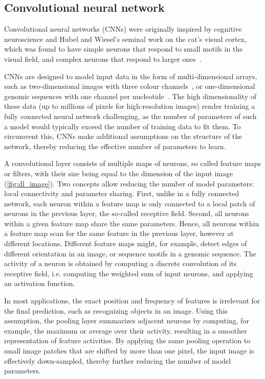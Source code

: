 \subsection{Convolutional neural network}
Convolutional neural networks (CNNs) were originally inspired by cognitive neuroscience and Hubel and Wiesel's seminal work on the cat's visual cortex, which was found to have simple neurons that respond to small motifs in the visual field, and complex neurons that respond to larger ones~\citep{hubel_shape_1963,hubel_period_1970}.

CNNs are designed to model input data in the form of multi-dimensional arrays, such as two-dimensional images with three colour channels~\citep{he_deep_2015,jarrett_what_2009,krizhevsky_imagenet_2012,lecun_backpropagation_1989,szegedy_rethinking_2015,zeiler_visualizing_2014-1}, or one-dimensional genomic sequences with one channel per nucleotide~\citep{alipanahi_predicting_2015,angermueller_accurate_2017,kelley_basset:_2016,zhou_predicting_2015}. The high dimensionality of these data (up to millions of pixels for high-resolution images) render training a fully connected neural network challenging, as the number of parameters of such a model would typically exceed the number of training data to fit them. To circumvent this, CNNs make additional assumptions on the structure of the network, thereby reducing the effective number of parameters to learn.

A convolutional layer consists of multiple maps of neurons, so called feature maps or filters, with their size being equal to the dimension of the input image (\autoref{fig:dl_image}). Two concepts allow reducing the number of model parameters: local connectivity and parameter sharing. First, unlike in a fully connected network, each neuron within a feature map is only connected to a local patch of neurons in the previous layer, the so-called receptive field. Second, all neurons within a given feature map share the same parameters. Hence, all neurons within a feature map scan for the same feature in the previous layer, however at different locations. Different feature maps might, for example, detect edges of different orientation in an image, or sequence motifs in a genomic sequence. The activity of a neuron is obtained by computing a discrete convolution of its receptive field, i.e. computing the weighted sum of input neurons, and applying an activation function.

In most applications, the exact position and frequency of features is irrelevant for the final prediction, such as recognizing objects in an image. Using this assumption, the pooling layer summarizes adjacent neurons by computing, for example, the maximum or average over their activity, resulting in a smoother representation of feature activities. By applying the same pooling operation to small image patches that are shifted by more than one pixel, the input image is effectively down-sampled, thereby further reducing the number of model parameters.

